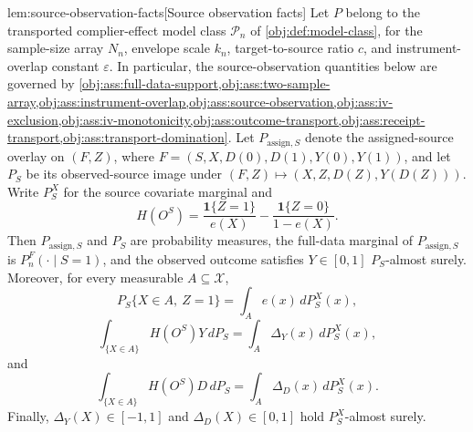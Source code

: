\documentclass[11pt]{article}
\begin{document}
\begin{lemmav}{lem:source-observation-facts}[Source observation facts]
Let \(P\) belong to the transported complier-effect model class \(\mathcal P_n\) of \cref{obj:def:model-class}, for the sample-size array \(N_n\), envelope scale \(k_n\), target-to-source ratio \(c\), and instrument-overlap constant \(\varepsilon\). In particular, the source-observation quantities below are governed by \cref{obj:ass:full-data-support,obj:ass:two-sample-array,obj:ass:instrument-overlap,obj:ass:source-observation,obj:ass:iv-exclusion,obj:ass:iv-monotonicity,obj:ass:outcome-transport,obj:ass:receipt-transport,obj:ass:transport-domination}. Let \(P_{\mathrm{assign},S}\) denote the assigned-source overlay on \((F,Z)\), where \(F=(S,X,D(0),D(1),Y(0),Y(1))\), and let \(P_S\) be its observed-source image under \((F,Z)\mapsto (X,Z,D(Z),Y(D(Z)))\). Write \(P_S^X\) for the source covariate marginal and
\[
H(O^S)
=
\frac{\mathbf 1\{Z=1\}}{e(X)}
-
\frac{\mathbf 1\{Z=0\}}{1-e(X)} .
\]
Then \(P_{\mathrm{assign},S}\) and \(P_S\) are probability measures, the full-data marginal of \(P_{\mathrm{assign},S}\) is \(P_n^F(\cdot\mid S=1)\), and the observed outcome satisfies \(Y\in[0,1]\) \(P_S\)-almost surely. Moreover, for every measurable \(A\subseteq\mathcal X\),
\[
P_S\{X\in A,\ Z=1\}
=
\int_A e(x)\,dP_S^X(x),
\]
\[
\int_{\{X\in A\}} H(O^S)Y\,dP_S
=
\int_A \Delta_Y(x)\,dP_S^X(x),
\]
and
\[
\int_{\{X\in A\}} H(O^S)D\,dP_S
=
\int_A \Delta_D(x)\,dP_S^X(x).
\]
Finally, \(\Delta_Y(X)\in[-1,1]\) and \(\Delta_D(X)\in[0,1]\) hold \(P_S^X\)-almost surely.
\end{lemmav}
\end{document}
